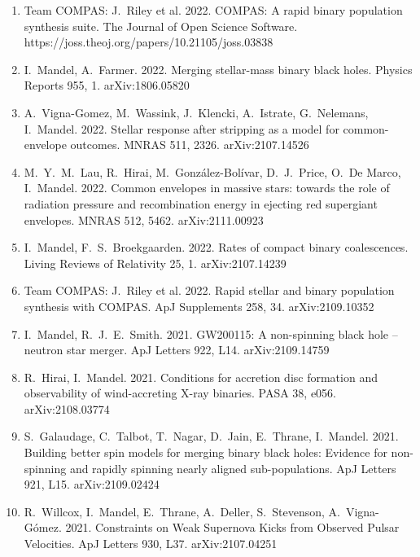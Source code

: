 \documentclass[margin,line]{res}
\begin{document}
\begin{resume}
\begin{enumerate}
\item Team COMPAS: J.~Riley et al. 2022.  COMPAS: A rapid binary population synthesis suite.  The Journal of Open Science Software.  https://joss.theoj.org/papers/10.21105/joss.03838

\item I.~Mandel, A.~Farmer.  2022.  Merging stellar-mass binary black holes.  Physics Reports 955, 1.  arXiv:1806.05820

\item A.~Vigna-Gomez, M.~Wassink, J.~Klencki, A.~Istrate, G.~Nelemans, I.~Mandel.  2022. Stellar response after stripping as a model for common-envelope outcomes. MNRAS 511, 2326.  arXiv:2107.14526

\item M.~Y.~M.~Lau, R.~Hirai, M.~Gonz\'alez-Bol\'ivar, D.~J.~Price, O.~De Marco, I.~Mandel. 2022. Common envelopes in massive stars: towards the role of radiation pressure and recombination energy in ejecting red supergiant envelopes. MNRAS 512, 5462.  arXiv:2111.00923

\item I.~Mandel, F.~S.~Broekgaarden. 2022. Rates of compact binary coalescences.  Living Reviews of Relativity 25, 1.  arXiv:2107.14239

\item Team COMPAS: J.~Riley et al. 2022.  Rapid stellar and binary population synthesis with COMPAS.  ApJ Supplements 258, 34.  arXiv:2109.10352

\item I.~Mandel, R.~J.~E.~Smith.  2021.  GW200115: A non-spinning black hole -- neutron star merger.  ApJ Letters 922, L14. arXiv:2109.14759

\item R.~Hirai, I.~Mandel. 2021. Conditions for accretion disc formation and observability of wind-accreting X-ray binaries. PASA 38, e056.  arXiv:2108.03774 

\item S.~Galaudage, C.~Talbot, T.~Nagar, D.~Jain, E.~Thrane, I.~Mandel.  2021. Building better spin models for merging binary black holes: Evidence for non-spinning and rapidly spinning nearly aligned sub-populations. ApJ Letters 921, L15.  arXiv:2109.02424

\item R.~Willcox, I.~Mandel, E.~Thrane, A.~Deller, S.~Stevenson, A.~Vigna-G{\'o}mez.  2021. Constraints on Weak Supernova Kicks from Observed Pulsar Velocities.  ApJ Letters 930, L37.  arXiv:2107.04251 


\end{enumerate}
\end{resume}
\end{document}
